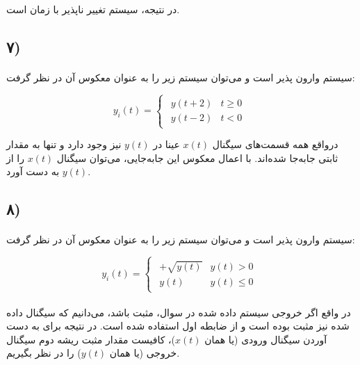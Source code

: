 \documentclass{article}
\begin{document}
	در نتیجه، سیستم تغییر ناپذیر با زمان است.

	\subsection*{۷)}
	\paragraph*{}
	سیستم وارون پذیر است و می‌توان سیستم زیر را به عنوان معکوس آن در نظر گرفت:

	\begin{equation*}
		y_i(t) =
		\begin{cases}
			\begin{matrix}
				y(t + 2) & t \ge 0 \\
				y(t - 2) & t < 0
			\end{matrix}
		\end{cases}
	\end{equation*}

	درواقع همه قسمت‌های سیگنال
	$x(t)$
	عینا در
	$y(t)$
	نیز وجود دارد و تنها به مقدار ثابتی جابه‌جا شده‌اند. با اعمال معکوس این جابه‌جایی، می‌توان سیگنال
	$x(t)$
	را از
	$y(t)$
	به دست آورد.


	\subsection*{۸)}
	\paragraph*{}
	سیستم وارون پذیر است و می‌توان سیستم زیر را به عنوان معکوس آن در نظر گرفت:

	\begin{equation*}
		y_i(t) =
		\begin{cases}
			\begin{matrix}
				+\sqrt{y(t)} & y(t) > 0 \\
				y(t) & y(t) \le 0
			\end{matrix}
		\end{cases}
	\end{equation*}

	\paragraph*{}
	در واقع اگر خروجی سیستم داده شده در سوال، مثبت باشد، می‌دانیم که سیگنال داده شده نیز مثبت بوده است و از ضابطه اول استفاده شده است. در نتیجه برای به دست آوردن سیگنال ورودی (یا همان $x(t)$)، کافیست مقدار مثبت ریشه دوم سیگنال خروجی (یا همان $y(t)$) را در نظر بگیریم.
\end{document}
